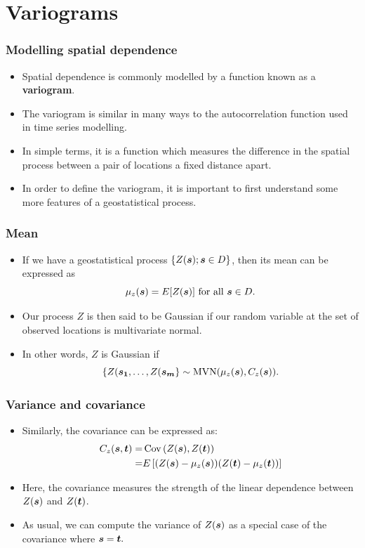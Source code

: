 \documentclass[parskip,12pt]{beamer}
\providecommand{\Cov}[1]{\operatorname{Cov}\left(#1\right)}
\newcommand{\bd}[1]{\ensuremath{\mbox{\boldmath $#1$}}}
\begin{document}
\section{Variograms}

\begin{frame}
\frametitle{Modelling spatial dependence}
 \begin{itemize}
\item Spatial dependence is commonly modelled by a function known as a \textbf{variogram}.
\vspace{3mm}
\item The variogram is similar in many ways to the autocorrelation function used in time series modelling.
\vspace{3mm}
\item In simple terms, it is a function which measures the difference in the spatial process between a pair of locations a fixed distance apart.
\vspace{3mm}
\item In order to define the variogram, it is important to first understand some more features of a geostatistical process.
\end{itemize}
\end{frame}


\begin{frame}
\frametitle{Mean}
 \begin{itemize}
\item If we have a geostatistical process $\{Z(\bd{s}); \bd{s} \in D\}$, then its mean can be expressed as $$\mu_z(\bd{s}) = E[{Z(\bd{s})}] \mbox{ for all } \bd{s} \in D.$$
\item Our process $Z$ is then said to be Gaussian if our random variable at the set of observed locations is multivariate normal.
\vspace{3mm}
\item In other words, $Z$ is Gaussian if $$\{ Z(\bd{s_1}, \ldots, Z(\bd{s_m} \} \sim \mbox{MVN}(\mu_z(\bd{s}), C_z(\bd{s})).$$
\end{itemize}
\end{frame}


\begin{frame}
\frametitle{Variance and covariance}
 \begin{itemize}
\item Similarly, the covariance can be expressed as:
\begin{align*}
C_z(\bd{s}, \bd{t}) =& \Cov{Z(\bd{s}), Z(\bd{t})}\\
=& E\left[(Z(\bd{s}) - \mu_z(\bd{s}))(Z(\bd{t}) - \mu_z(\bd{t}))\right]
\end{align*}
\item Here, the covariance measures the strength of the linear dependence between $Z(\bd{s})$ and $Z(\bd{t})$.
\vspace{3mm}
\item As usual, we can compute the variance of $Z(\bd{s})$ as a special case of the covariance where $\bd{s} = \bd{t}.$
\end{itemize}
\end{frame}
\end{document}
